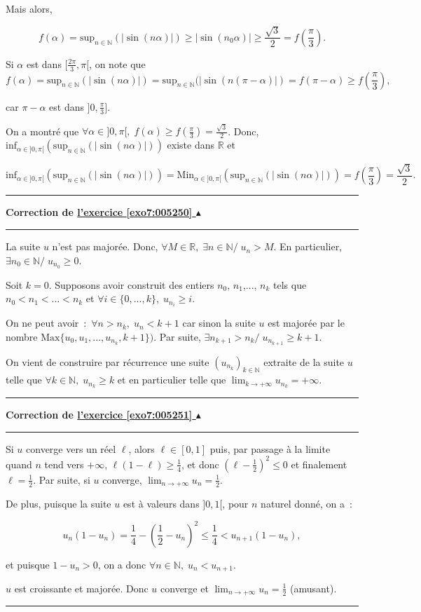 \documentclass[11pt,a4paper]{article}
\newcommand{\Nn}{\mathbb{N}} \newcommand{\N}{\mathbb{N}}
\newcommand{\Rr}{\mathbb{R}} \newcommand{\R}{\mathbb{R}}
\newcounter{exo}
\newcommand{\correction}[1]{\hypertarget{cor7:#1}{}\label{cor7:#1}{\bf Correction de \hyperlink{exo7:#1}{l'exercice \ref{exo7:#1} $\blacktriangle$}}\vspace{1mm}\hrule\vspace{1mm}}
\newcommand{\fincorrection}{\vspace{1mm}\hrule\vspace*{7mm}}
\begin{document}
Mais alors,

$$f(\alpha)=\mbox{sup}_{n\in\Nn}(|\sin(n\alpha)|)\geq|\sin(n_0\alpha)|\geq\frac{\sqrt{3}}{2}=f(\frac{\pi}{3}).$$

Si $\alpha$ est dans $[\frac{2\pi}{3},\pi[$, on note que 
$$f(\alpha)=\mbox{sup}_{n\in\Nn}(|\sin(n\alpha)|)=\mbox{sup}_{n\in\Nn}(|\sin(n(\pi-\alpha)|)=f(\pi-\alpha)\geq f(\frac{\pi}{3}),$$

car $\pi-\alpha$ est dans $]0,\frac{\pi}{3}]$.

On a montré que $\forall\alpha\in]0,\pi[,\;f(\alpha)\geq f(\frac{\pi}{3})=\frac{\sqrt{3}}{2}$. Donc, $\mbox{inf}_{\alpha\in]0,\pi[}(\mbox{sup}_{n\in\Nn}(|\sin(n\alpha)|))$ existe dans $\Rr$ et 

$$\mbox{inf}_{\alpha\in]0,\pi[}(\mbox{sup}_{n\in\Nn}(|\sin(n\alpha)|))= \mbox{Min}_{\alpha\in]0,\pi[}(\mbox{sup}_{n\in\Nn}(|\sin(n\alpha)|))=f(\frac{\pi}{3})=\frac{\sqrt{3}}{2}.$$
\fincorrection
\correction{005250}
La suite $u$ n'est pas majorée. Donc, $\forall M\in\Rr,\;\exists n\in\Nn/\;u_n> M$. En particulier, $\exists n_0\in\Nn/\;u_{n_0}\geq0$.

Soit $k=0$. Supposons avoir construit des entiers $n_0$, $n_1$,..., $n_k$ tels que $n_0<n_1<...<n_k$ et $\forall i\in\{0,...,k\},\;u_{n_i}\geq i$.

On ne peut avoir~:~$\forall n>n_k,\;u_n<k+1$ car sinon la suite $u$ est majorée par le nombre 
$\mbox{Max}\{u_0,u_1,...,u_{n_k},k+1\})$. Par suite, $\exists n_{k+1}>n_k/\;u_{n_{k+1}}\geq k+1$.

On vient de construire par récurrence une suite $(u_{n_k})_{k\in\Nn}$ extraite de la suite $u$ telle que $\forall k\in\Nn,\;u_{n_k}\geq k$ et en particulier telle que $\lim_{k\rightarrow +\infty}u_{n_k}=+\infty$.

\fincorrection
\correction{005251}
Si $u$ converge vers un réel $\ell$, alors $\ell\in[0,1]$ puis, par passage à la limite quand $n$ tend vers $+\infty$,  $\ell(1-\ell)\geq\frac{1}{4}$, et donc $(\ell-\frac{1}{2})^2\leq0$ et finalement $\ell=\frac{1}{2}$. Par suite, si $u$ converge, $\lim_{n\rightarrow +\infty}u_n=\frac{1}{2}$.

De plus, puisque la suite $u$ est à valeurs dans $]0,1[$, pour $n$ naturel donné, on a~:

$$u_n(1-u_n)=\frac{1}{4}-(\frac{1}{2}-u_n)^2\leq\frac{1}{4}<u_{n+1}(1-u_n),$$

et puisque $1-u_n>0$, on a donc $\forall n\in\Nn,\;u_n<u_{n+1}$.

$u$ est croissante et majorée. Donc $u$ converge et $\lim_{n\rightarrow +\infty}u_n=\frac{1}{2}$ (amusant).
\fincorrection
\end{document}
